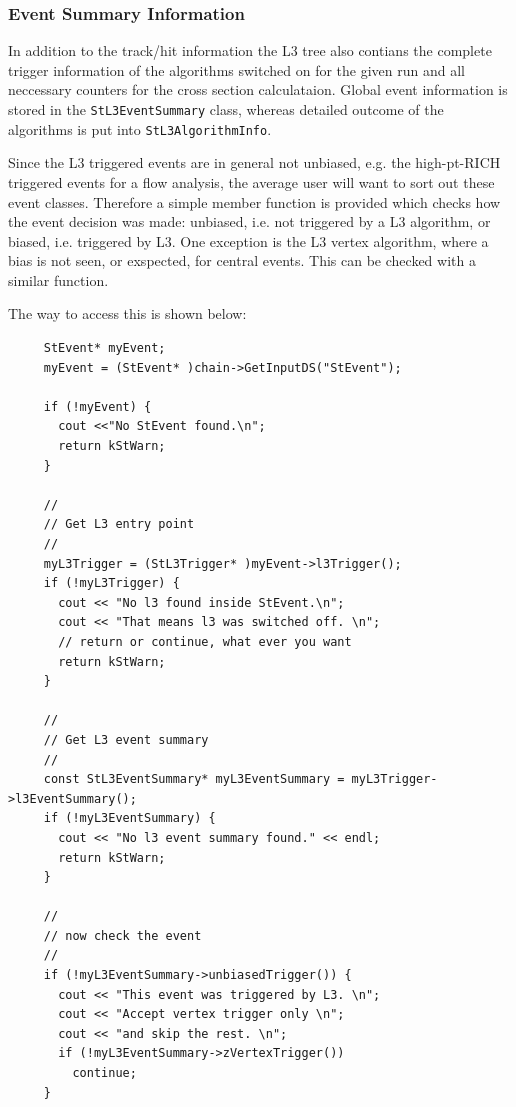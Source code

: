 \documentclass[twoside]{article}
\begin{document}
\subsubsection{Event Summary Information}
In addition to the track/hit information the L3 tree also contians the
complete trigger information of the algorithms switched on for the
given run and all neccessary counters for the cross section
calculataion. Global event information is stored in the \texttt{StL3EventSummary}
class, whereas detailed outcome of the algorithms is put into \texttt{StL3AlgorithmInfo}. 

Since the L3 triggered events are in general not unbiased,
e.g. the high-pt-RICH triggered events for a flow analysis,
the average user will want to sort out these event classes.
Therefore a simple member function is provided which checks how the
event decision was made: unbiased, i.e. not triggered by a L3
algorithm, or biased, i.e. triggered by L3. One exception is the L3
vertex algorithm, where a bias is not seen, or exspected, for central
events. This can be checked with a similar function.

The way to access this is shown below:
\begin{verbatim}
     StEvent* myEvent;
     myEvent = (StEvent* )chain->GetInputDS("StEvent");

     if (!myEvent) {
       cout <<"No StEvent found.\n";
       return kStWarn;  
     }

     //
     // Get L3 entry point
     //
     myL3Trigger = (StL3Trigger* )myEvent->l3Trigger();
     if (!myL3Trigger) {
       cout << "No l3 found inside StEvent.\n";
       cout << "That means l3 was switched off. \n";
       // return or continue, what ever you want
       return kStWarn;
     }

     //
     // Get L3 event summary
     //
     const StL3EventSummary* myL3EventSummary = myL3Trigger->l3EventSummary();
     if (!myL3EventSummary) {
       cout << "No l3 event summary found." << endl;
       return kStWarn;
     }

     //
     // now check the event
     //
     if (!myL3EventSummary->unbiasedTrigger()) {
       cout << "This event was triggered by L3. \n";
       cout << "Accept vertex trigger only \n";
       cout << "and skip the rest. \n";
       if (!myL3EventSummary->zVertexTrigger())
         continue;
     }
\end{verbatim}
\end{document}
